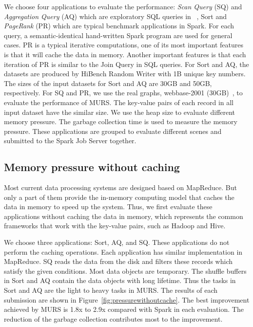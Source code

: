 We choose four applications to evaluate the performance: \textit{Scan Query} (SQ) and \textit{Aggregation Query} (AQ) which are exploratory SQL queries in ~\cite{www:benchmark}, Sort and \textit{PageRank} (PR) which are typical benchmark applications in Spark. For each query, a semantic-identical hand-written Spark program are used for general cases. PR is a typical iterative computations, one of its most important features is that it will cache the data in memory. 
Another important features is that each iteration of PR is similar to the Join Query in SQL queries.
For Sort and AQ, the datasets are produced by HiBench Random Writer with 1B unique key numbers. The sizes of the input datasets for Sort and AQ are 30GB and 50GB, respectively. For SQ and PR, we use the real graphs, webbase-2001 (30GB)~\cite{boldi:webgraph}, to evaluate the performance of MURS. The key-value pairs of each record in all input dataset have the similar size. We use the heap size to evaluate different memory pressure. The garbage collection time is used to measure the memory pressure. These applications are grouped to evaluate different scenes and submitted to the Spark Job Server together.

\subsection{Memory pressure without caching}

Most current data processing systems are designed based on MapReduce. But only a part of them provide the in-memory computing model that caches the data in memory to speed up the system. Thus, we first evaluate these applications without caching the data in memory, which represents the common frameworks that work with the key-value pairs, such as Hadoop and Hive.

We choose three applications: Sort, AQ, and SQ. These applications do not perform the caching operations. Each application has similar implementation in MapReduce. SQ reads the data from the disk and filters these records which satisfy the given conditions. Most data objects are temporary. The shuffle buffers in Sort and AQ contain the data objects with long lifetime. Thus the tasks in Sort and AQ are the light to heavy tasks in MURS. The results of each submission are shown in Figure~\ref{fig:pressurewithoutcache}. The best improvement achieved by MURS is 1.8x to 2.9x compared with Spark in each evaluation. The reduction of the garbage collection contributes most to the improvement.

